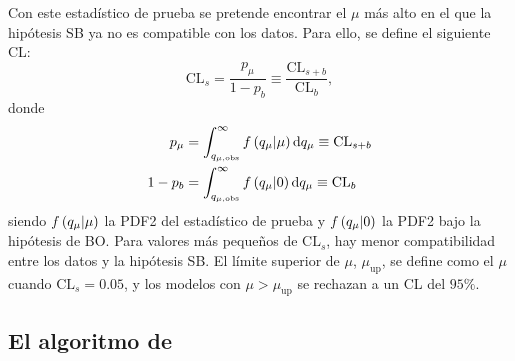 Con este estadístico de prueba se pretende encontrar el \(\mu\) más alto en el que la hipótesis \ac{SB} ya no es compatible con los datos. Para ello, se define el siguiente \ac{CL}:
\begin{equation}
    \text{CL}_s = \frac{p_\mu}{1 - p_b} \equiv \frac{\text{CL}_{s+b}}{\text{CL}_b},
\end{equation}
donde
\begin{align}
    p_{\mu} &= \int_{q_{\mu, \text{obs}}}^{\infty} f \left(q_{\mu} | \mu\right) \dd{\ensuremath{q_{\mu}}} \equiv \text{CL}_{s+b}\\
    1 - p_{b} &= \int_{q_{\mu, \text{obs}}}^{\infty} f \left(q_{\mu} | 0\right) \dd{\ensuremath{q_{\mu}}} \equiv \text{CL}_{b}
\end{align}
siendo \(f \left(q_{\mu} | \mu\right)\) la \ac{PDF2} del estadístico de prueba \qmu y \(f \left(q_{\mu} | 0\right)\) la \ac{PDF2} bajo la hipótesis de \ac{BO}. Para valores más pequeños de \(\text{CL}_s\), hay menor compatibilidad entre los datos y la hipótesis \ac{SB}. El límite superior de \(\mu\), \(\mu_{\text{up}}\), se define como el \(\mu\) cuando \(\text{CL}_s = 0.05\), y los modelos con \(\mu > \mu_{\text{up}}\) se rechazan a un \ac{CL} del \(95\%\).




\subsection{El algoritmo de \bh}
\label{subsec:strategy:stat_treatment:bh}


